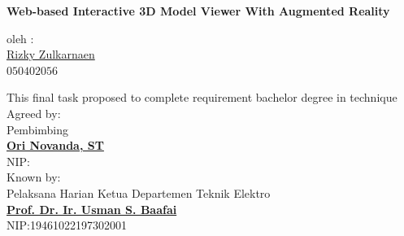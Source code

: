 \documentclass[12pt,a4paper,pdftex,final,oneside,titlepage]{book}
\begin{document}
\thispagestyle{empty} 
\begin{center}{%

\textbf{\large Web-based Interactive 3D Model Viewer With Augmented Reality}\\[1cm] 

\par 
\vspace{0.4cm} 
oleh : 
\\[1cm] 
{\large\underline{Rizky Zulkarnaen}}\\ 
$050402056$
} 
\vspace{1.4cm} 

This final task proposed to complete requirement bachelor degree in technique \\[0.2cm] 

Agreed by:\\ 
Pembimbing\\[2.2cm] 
\textbf{\bfseries \underline{Ori Novanda, ST}}\\[0.2cm] 
NIP:\\[0.4cm]
Known by:\\ 
Pelaksana Harian Ketua Departemen Teknik Elektro\\[2.2cm] 
\textbf{\bfseries \underline{Prof. Dr. Ir. Usman S. Baafai}}\\[0.2cm] 
NIP:19461022197302001\\ 

\end{center} 
\pagestyle{fancy}
\lhead{} \chead{} \rhead{\thepage}
\lfoot{} \cfoot{} \rfoot{}
\renewcommand\headrulewidth{0pt}
\renewcommand\footrulewidth{0pt}

\setcounter{tocdepth}{5} 
\setcounter{secnumdepth}{3} %
\end{document}

